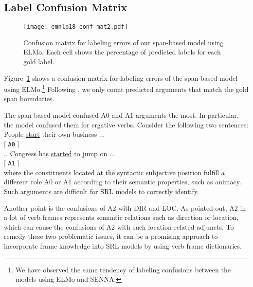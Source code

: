\documentclass[11pt,a4paper]{article}
\begin{document}
\subsection*{Label Confusion Matrix}
\begin{figure}[t]
  \begin{center}
    \texttt{[image: emnlp18-conf-mat2.pdf]}
  \end{center}
  \vspace{-0.2cm}
  \caption{\label{fig:label-conf} Confusion matrix for labeling errors of our span-based model using ELMo. Each cell shows the percentage of predicted labels for each gold label.}
\end{figure}

\noindent
Figure~\ref{fig:label-conf} shows a confusion matrix for labeling errors of the span-based model using ELMo.\footnote{We have observed the same tendency of labeling confusions between the models using ELMo and SENNA.}
Following , we only count predicted arguments that match the gold span boundaries.

The span-based model confused A0 and A1 arguments the most.
In particular, the model confused them for ergative verbs.
Consider the following two sentences:\vspace{-0.3cm}\\

\noindent
\hspace{0.5cm} People \underline{start} their own business ... \\
\vspace{0.2cm}\hspace{0.5cm} [\hspace{0.1cm} {\tt A0} \hspace{0.1cm}] \\
\hspace{0.5cm} .. Congress has \underline{started} to jump on ... \\
\vspace{-0.3cm}\hspace{0.2cm} [\hspace{0.3cm} {\tt A1} \hspace{0.3cm}] \\

\noindent
where the constituents located at the syntactic subjective position fulfill a different role A0 or A1 according to their semantic properties, such as animacy.
Such arguments are difficult for SRL models to correctly identify.

Another point is the confusions of A2 with DIR and LOC.
As  pointed out, A2 in a lot of verb frames represents semantic relations such as direction or location, which can cause the confusions of A2 with such location-related adjuncts.
To remedy these two problematic issues, it can be a promising approach to incorporate frame knowledge into SRL models by using verb frame dictionaries.
\end{document}
